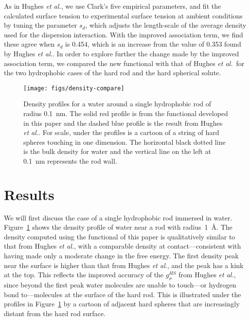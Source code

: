 \documentclass[twocolumn,amsmath,amssymb]{revtex4-1}
\newcommand\lscale{\ensuremath{s_d}}
\newcommand\hughesetal{Hughes \emph{et al.}}
\begin{document}
As in \hughesetal, we use Clark's five empirical parameters, and fit
the calculated surface tension to experimental surface tension at
ambient conditions by tuning the parameter $\lscale$, which adjusts
the length-scale of the average density used for the dispersion
interaction.  With the improved association term, we find these agree
when $\lscale$ is 0.454, which is an increase from the value of 0.353
found by \hughesetal.  In order to explore further the change made by
the improved association term, we compared the new functional with
that of \hughesetal\ for the two hydrophobic cases of the hard rod and
the hard spherical solute.

\begin{figure}
\begin{center}
\texttt{[image: figs/density-compare]}
\end{center}
\caption{ Density profiles for a water around a single hydrophobic rod
  of radius 0.1~nm. The solid red profile is from the functional
  developed in this paper and the dashed blue profile is the result
  from \hughesetal.  For scale, under the profiles
  is a cartoon of a string of hard spheres touching in one
  dimension. The horizontal black dotted line is the bulk density for
  water and the vertical line on the left at 0.1~nm represents the
  rod wall.}
\label{fig:density-single-rod}
\end{figure}

\section{Results}

We will first discuss the case of a single hydrophobic rod immersed in
water. Figure~\ref{fig:density-single-rod} shows the density profile
of water near a rod with radius~1~\AA.  The density computed using the
functional of this paper is qualitatively similar to that from
\hughesetal, with a comparable density at contact---consistent with
having made only a moderate change in the free energy.  The first
density peak near the surface is higher than that from \hughesetal,
and the peak has a kink at the top.  This reflects the improved
accuracy of the $g_\sigma^\textit{HS}$ from \hughesetal, since beyond
the first peak water molecules are unable to touch---or hydrogen bond
to---molecules at the surface of the hard rod. This is illustrated
under the profiles in Figure~\ref{fig:density-single-rod} by a cartoon
of adjacent hard spheres that are increasingly distant from the hard
rod surface.
\end{document}
